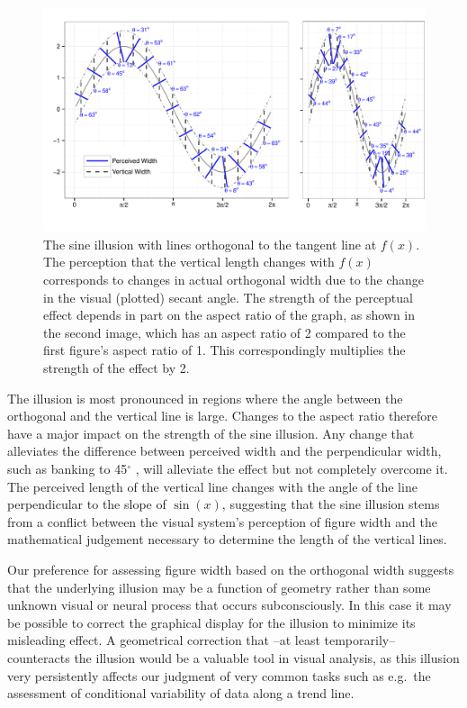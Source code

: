 \documentclass[11pt]{isuthesis}\usepackage[]{graphicx}\usepackage[]{color}
\begin{document}
\begin{figure}[h!tbp]
\includegraphics[width=.9\textwidth, keepaspectratio=TRUE]{fig-transform-illustration}
\centering
\caption[Geometry of the sine illusion]{\label{fig:OrthogonalWidth} The sine illusion with lines orthogonal to the tangent line at $f(x)$. The perception that the vertical length changes with $f(x)$ corresponds to changes in actual orthogonal width due to the change in the visual (plotted) secant angle. The strength of the perceptual effect depends in part on the aspect ratio of the graph, as shown in the second image, which has an aspect ratio of 2 compared to the first figure's aspect ratio of 1. This correspondingly multiplies the strength of the effect by 2. 
}
\end{figure}
The illusion is most pronounced in regions where the angle between the orthogonal  and the vertical line is large. Changes to the aspect ratio therefore have a major impact on the strength of the sine illusion. Any change that alleviates the difference between perceived width and the perpendicular width, such as banking to 45$^\circ$ \citep{cleveland:88}, will alleviate the effect but not completely overcome it. 
The perceived length of the vertical line changes with the angle of the line perpendicular to the slope of $\sin(x)$, suggesting that the sine illusion stems from a conflict between the visual system's perception of figure width and the mathematical judgement necessary to determine the length of the vertical lines. 




Our preference for assessing figure width based on the orthogonal width suggests that the underlying illusion may be a function of geometry rather than some unknown visual or neural process that occurs subconsciously. In this  case it may be  possible to correct the graphical display for the illusion to minimize its misleading effect. A geometrical correction that  --at least temporarily-- counteracts the illusion would be a valuable tool in visual analysis, as this illusion very persistently affects our judgment of very common tasks  such as e.g.~the assessment of conditional variability of data along a trend line.
\end{document}
